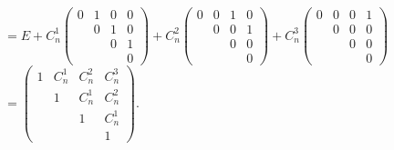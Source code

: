 		 $= E + C_n^1\begin{pmatrix}
				 0 & 1 & 0 & 0 \\
				   & 0 & 1 & 0 \\
				   &   & 0 & 1 \\
				   &   &   & 0
			 \end{pmatrix} + C_n^2\begin{pmatrix}
				 0 & 0 & 1 & 0 \\
				   & 0 & 0 & 1 \\
				   &   & 0 & 0 \\
				   &   &   & 0
			 \end{pmatrix} + C_n^3\begin{pmatrix}
				 0 & 0 & 0 & 1 \\
				   & 0 & 0 & 0 \\
				   &   & 0 & 0 \\
				   &   &   & 0
			 \end{pmatrix}$
		 $= \begin{pmatrix}
				 1 & C_n^1 & C_n^2 & C_n^3 \\
				   & 1     & C_n^1 & C_n^2 \\
				   &       & 1     & C_n^1 \\
				   &       &       & 1
			 \end{pmatrix}$.